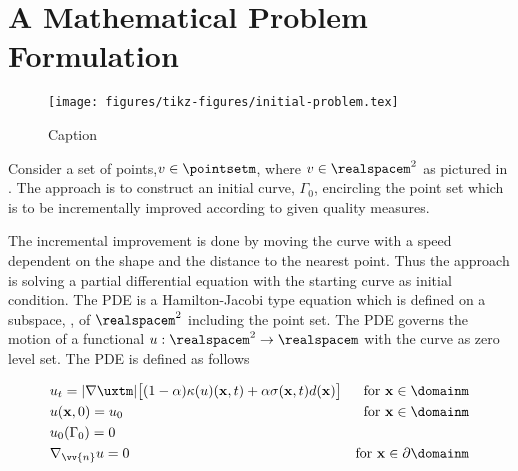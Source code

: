 \section{A Mathematical Problem Formulation}
\begin{figure}
    \centering
    \texttt{[image: figures/tikz-figures/initial-problem.tex]}
    \caption[Problem description]{Caption}
    \label{fig:problem-description}
\end{figure}
Consider a set of points,$v \in \pointsetm$, where $v \in \realspacem^2$ as pictured in . The approach is to construct an initial curve, $\Gamma_0$, encircling the point set which is to be incrementally improved according to given quality measures. 

The incremental improvement is done by moving the curve with a speed dependent on the shape and the distance to the nearest point. Thus the approach is solving a partial differential equation with the starting curve as initial condition. The PDE is a Hamilton-Jacobi type equation which is defined on a subspace, \domain, of $\realspacem^2$ including the point set. The PDE governs the motion of a functional $u : \realspacem^2 \to \realspacem$ with the curve as zero level set. The PDE is defined as follows

\begin{tcolorbox}[title=Mathematical formulation of our PDE model]
\begin{alignat}{2}
    &u_t = |\nabla \uxtm | \big[ (1-\alpha) \kappa(u)(\mathbf{x}, t) + \alpha \sigma(\mathbf{x}, t) d(\mathbf{x})  \big] & \text{for }\mathbf{x}\in \domainm \\
    &u(\mathbf{x}, 0) = u_0 & \text{for }\mathbf{x}\in \domainm\\
    &u_0(\Gamma_0) = 0  & \\
    &\nabla_{\vv{n}} u = 0 &\text{for } \mathbf{x} \in \partial\domainm
\end{alignat}
\end{tcolorbox}



